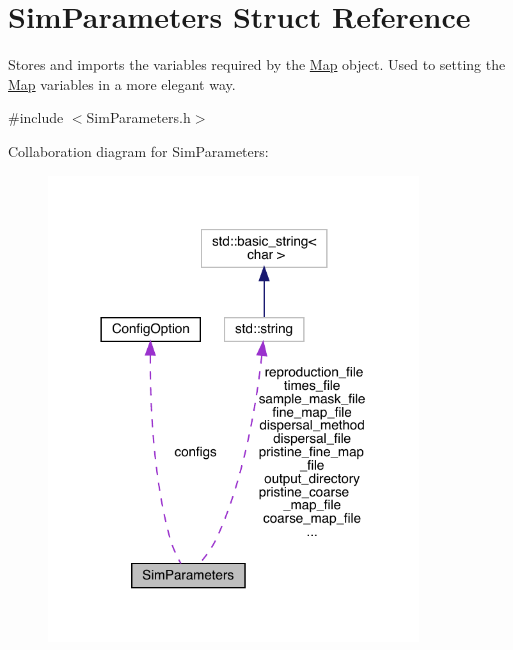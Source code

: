 \hypertarget{struct_sim_parameters}{}\section{Sim\+Parameters Struct Reference}
\label{struct_sim_parameters}


Stores and imports the variables required by the \hyperlink{class_map}{Map} object. Used to setting the \hyperlink{class_map}{Map} variables in a more elegant way.  




{\ttfamily \#include $<$Sim\+Parameters.\+h$>$}



Collaboration diagram for Sim\+Parameters\+:\nopagebreak
\begin{figure}[H]
\begin{center}
\leavevmode
\includegraphics[width=278pt]{struct_sim_parameters__coll__graph}
\end{center}
\end{figure}
